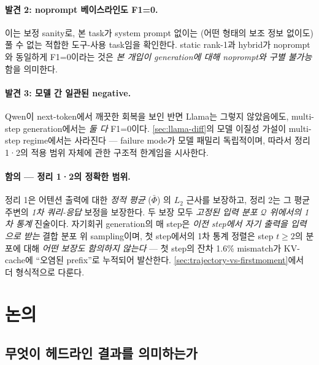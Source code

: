 \documentclass{article}
\theoremstyle{definition}
\newcommand{\bphi}{\bar{\Phi}}
\begin{document}
\paragraph{발견 2: noprompt 베이스라인도 F1=0.}
이는 보정 sanity로, 본 task가 system prompt 없이는 (어떤 형태의 보조 정보 없이도) 풀 수 없는 적합한 도구-사용 task임을 확인한다. static rank-1과 hybrid가 noprompt와 동일하게 F1=0이라는 것은 \emph{본 개입이 generation에 대해 noprompt와 구별 불가능}함을 의미한다.

\paragraph{발견 3: 모델 간 일관된 negative.}
Qwen이 next-token에서 깨끗한 회복을 보인 반면 Llama는 그렇지 않았음에도, multi-step generation에서는 \emph{둘 다} F1=0이다. \cref{sec:llama-diff}의 모델 이질성 가설이 multi-step regime에서는 사라진다 — failure mode가 모델 패밀리 독립적이며, 따라서 정리 1·2의 적용 범위 자체에 관한 구조적 한계임을 시사한다.

\paragraph{함의 — 정리 1·2의 정확한 범위.}
정리 1은 어텐션 출력에 대한 \emph{정적 평균} ($\bphi$) 의 $L_2$ 근사를 보장하고, 정리 2는 그 평균 주변의 \emph{1차 쿼리-응답} 보정을 보장한다. 두 보장 모두 \emph{고정된 입력 분포 $\mathcal{Q}$ 위에서의 1차 통계} 진술이다. 자기회귀 generation의 매 step은 \emph{이전 step에서 자기 출력을 입력으로 받는} 결합 분포 위 sampling이며, 첫 step에서의 1차 통계 정렬은 step $t \ge 2$의 분포에 대해 \emph{어떤 보장도 함의하지 않는다} — 첫 step의 잔차 1.6\% mismatch가 KV-cache에 ``오염된 prefix''로 누적되어 발산한다. \cref{sec:trajectory-vs-firstmoment}에서 더 형식적으로 다룬다.

\section{논의}
\label{sec:discussion}

\subsection{무엇이 헤드라인 결과를 의미하는가}
\label{sec:meaning}
\end{document}
